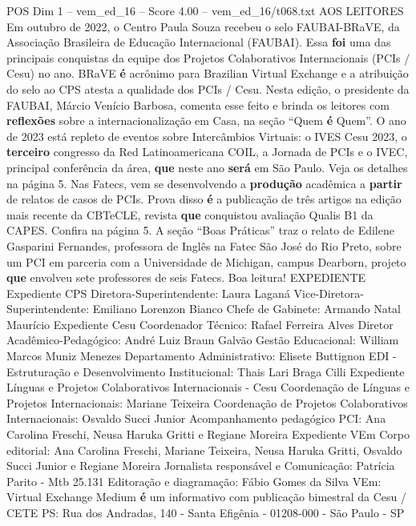 \begin{textsample}{POS Dim 1 – vem\_ed\_16 – Score 4.00 – vem\_ed\_16/t068.txt}  \label{ex:f1_pos_092}
AOS LEITORES Em outubro de 2022, o Centro Paula Souza recebeu o selo FAUBAI-BRaVE, da Associação Brasileira de Educação Internacional (FAUBAI).
Essa \textbf{foi} uma das principais conquistas da equipe dos Projetos Colaborativos Internacionais (PCIs / Cesu) no ano.
BRaVE \textbf{é} acrônimo para Brazilian Virtual Exchange e a atribuição do selo ao CPS atesta a qualidade dos PCIs / Cesu.
Nesta edição, o presidente da FAUBAI, Márcio Venício Barbosa, comenta esse feito e brinda os leitores com \textbf{reflexões} sobre a internacionalização em Casa, na seção “Quem \textbf{é} Quem”.
O ano de 2023 está repleto de eventos sobre Intercâmbios Virtuais: o IVES Cesu 2023, o \textbf{terceiro} congresso da Red Latinoamericana COIL, a Jornada de PCIs e o IVEC, principal conferência da área, \textbf{que} neste ano \textbf{será} em São Paulo.
Veja os detalhes na página 5.
Nas Fatecs, vem se desenvolvendo a \textbf{produção} acadêmica a \textbf{partir} de relatos de casos de PCIs.
Prova disso \textbf{é} a publicação de três artigos na edição mais recente da CBTeCLE, revista \textbf{que} conquistou avaliação Qualis B1 da CAPES.
Confira na página 5.
A seção “Boas Práticas” traz o relato de Edilene Gasparini Fernandes, professora de Inglês na Fatec São José do Rio Preto, sobre um PCI em parceria com a Universidade de Michigan, campus Dearborn, projeto \textbf{que} envolveu sete professores de seis Fatecs.
Boa leitura!
EXPEDIENTE Expediente CPS Diretora-Superintendente: Laura Laganá Vice-Diretora-Superintendente: Emiliano Lorenzon Bianco Chefe de Gabinete: Armando Natal Maurício Expediente Cesu Coordenador Técnico: Rafael Ferreira Alves Diretor Acadêmico-Pedagógico: André Luiz Braun Galvão Gestão Educacional: William Marcos Muniz Menezes Departamento Administrativo: Elisete Buttignon EDI - Estruturação e Desenvolvimento Institucional: Thais Lari Braga Cilli Expediente Línguas e Projetos Colaborativos Internacionais - Cesu Coordenação de Línguas e Projetos Internacionais: Mariane Teixeira Coordenação de Projetos Colaborativos Internacionais: Osvaldo Succi Junior Acompanhamento pedagógico PCI: Ana Carolina Freschi, Neusa Haruka Gritti e Regiane Moreira Expediente VEm Corpo editorial: Ana Carolina Freschi, Mariane Teixeira, Neusa Haruka Gritti, Osvaldo Succi Junior e Regiane Moreira Jornalista responsável e Comunicação: Patrícia Parito - Mtb 25.131 Editoração e diagramação: Fábio Gomes da Silva VEm: Virtual Exchange Medium \textbf{é} um informativo com publicação bimestral da Cesu / CETE PS: Rua dos Andradas, 140 - Santa Efigênia - 01208-000 - São Paulo - SP

\end{textsample}
